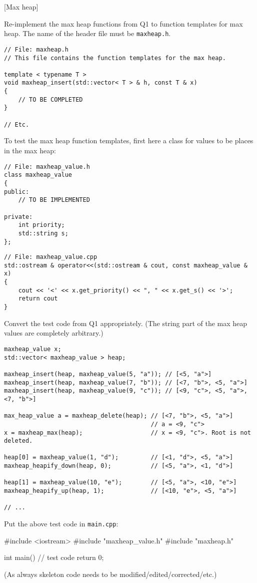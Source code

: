[Max heap]

Re-implement the max heap functions
from Q1 to function templates for max heap.
The name of the header file must be
\texttt{maxheap.h}.

\begin{Verbatim}[frame=single]
// File: maxheap.h
// This file contains the function templates for the max heap.

template < typename T >
void maxheap_insert(std::vector< T > & h, const T & x)
{
    // TO BE COMPLETED
}

// Etc.
\end{Verbatim}

To test the max heap function templates,
first here a class for values to be places in the max heap:
\begin{Verbatim}[frame=single]
// File: maxheap_value.h
class maxheap_value
{
public:
    // TO BE IMPLEMENTED
    
private:
    int priority;
    std::string s;
};
\end{Verbatim}
\begin{Verbatim}[frame=single]
// File: maxheap_value.cpp
std::ostream & operator<<(std::ostream & cout, const maxheap_value & x)
{
    cout << '<' << x.get_priority() << ", " << x.get_s() << '>';
    return cout
}
\end{Verbatim}

Convert the test code from Q1 appropriately.
(The string part of the max heap values are completely arbitrary.)

{\small
\begin{Verbatim}[frame=single]
maxheap_value x;
std::vector< maxheap_value > heap;

maxheap_insert(heap, maxheap_value(5, "a")); // [<5, "a">]
maxheap_insert(heap, maxheap_value(7, "b")); // [<7, "b">, <5, "a">]
maxheap_insert(heap, maxheap_value(9, "c")); // [<9, "c">, <5, "a">, <7, "b">]

max_heap_value a = maxheap_delete(heap); // [<7, "b">, <5, "a">]
                                         // a = <9, "c">
x = maxheap_max(heap);                   // x = <9, "c">. Root is not deleted.

heap[0] = maxheap_value(1, "d");         // [<1, "d">, <5, "a">]
maxheap_heapify_down(heap, 0);           // [<5, "a">, <1, "d">]

heap[1] = maxheap_value(10, "e");        // [<5, "a">, <10, "e">]
maxheap_heapify_up(heap, 1);             // [<10, "e">, <5, "a">]

// ...
\end{Verbatim}
}

Put the above test code in \texttt{main.cpp}:
\begin{console}
#include <iostream>
#include "maxheap_value.h"
#include "maxheap.h"

int main()
{
    // test code
    return 0;
}
\end{console}

(As always skeleton code needs to be modified/edited/corrected/etc.)


